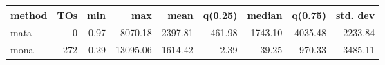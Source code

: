 \begin{tabular}{lrrrrrrrr}
\hline
 method   &    TOs &   min &      max &    mean &   q(0.25) &   median &   q(0.75) &   std. dev \\
\hline
 mata     &   0 &  0.97 &  8070.18 & 2397.81 &    461.98 &  1743.10 &   4035.48 &    2233.84 \\
 mona     & 272 &  0.29 & 13095.06 & 1614.42 &      2.39 &    39.25 &    970.33 &    3485.11 \\
\hline
\end{tabular}
